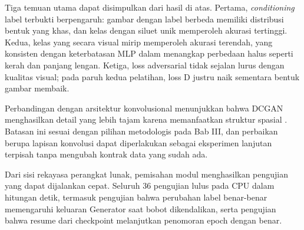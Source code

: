 Tiga temuan utama dapat disimpulkan dari hasil di atas. Pertama, \textit{conditioning} label terbukti berpengaruh: gambar dengan label berbeda memiliki distribusi bentuk yang khas, dan kelas dengan siluet unik memperoleh akurasi tertinggi. Kedua, kelas yang secara visual mirip memperoleh akurasi terendah, yang konsisten dengan keterbatasan MLP dalam menangkap perbedaan halus seperti kerah dan panjang lengan. Ketiga, loss adversarial tidak sejalan lurus dengan kualitas visual; pada paruh kedua pelatihan, loss D justru naik sementara bentuk gambar membaik.

Perbandingan dengan arsitektur konvolusional menunjukkan bahwa DCGAN menghasilkan detail yang lebih tajam karena memanfaatkan struktur spasial \citep{radford2015dcgan}. Batasan ini sesuai dengan pilihan metodologis pada Bab III, dan perbaikan berupa lapisan konvolusi dapat diperlakukan sebagai eksperimen lanjutan terpisah tanpa mengubah kontrak data yang sudah ada.

Dari sisi rekayasa perangkat lunak, pemisahan modul menghasilkan pengujian yang dapat dijalankan cepat. Seluruh 36 pengujian lulus pada CPU dalam hitungan detik, termasuk pengujian bahwa perubahan label benar-benar memengaruhi keluaran Generator saat bobot dikendalikan, serta pengujian bahwa resume dari checkpoint melanjutkan penomoran epoch dengan benar.
